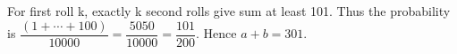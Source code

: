 For first roll k, exactly k second rolls give sum at least 101. Thus the probability is $\dfrac{(1+\cdots+100)}{10000}=\dfrac{5050}{10000}=\dfrac{101}{200}$. Hence $a+b=\boxed{301}$.

